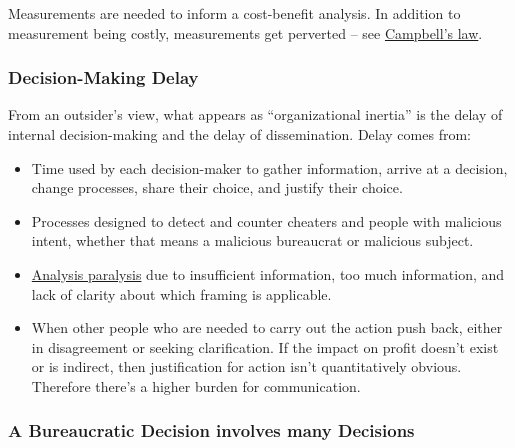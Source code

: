 Measurements are needed to inform a cost-benefit analysis. In addition to measurement being costly, measurements get perverted -- see \href{https://en.wikipedia.org/wiki/Campbell\%27s_law}{Campbell's law}. 

\subsubsection*{Decision-Making Delay\label{sec:decision-delay}}

From an outsider's view, what appears as ``organizational inertia'' is the delay of internal decision-making and the delay of dissemination. 
Delay comes from:
\begin{itemize}
    \item Time used by each decision-maker to gather information, arrive at a decision, change processes, share their choice, and justify their choice. 
    \item Processes designed to detect and counter cheaters and people with malicious intent, whether that means a malicious bureaucrat or malicious subject. 
\item \href{https://en.wikipedia.org/wiki/Analysis_paralysis}{Analysis paralysis} 
\iftoggle{WPinmargin}{\marginpar{$>$Wikipedia: Analysis paralysis}}{}
due to insufficient information, too much information, and lack of clarity about which framing is applicable.
\item When other people who are needed to carry out the action push back, either in disagreement or seeking clarification. If the impact on profit doesn't exist or is indirect, then justification for action isn't quantitatively obvious. Therefore there's a higher burden for communication.
\end{itemize}




\subsubsection*{A Bureaucratic Decision involves many Decisions}

